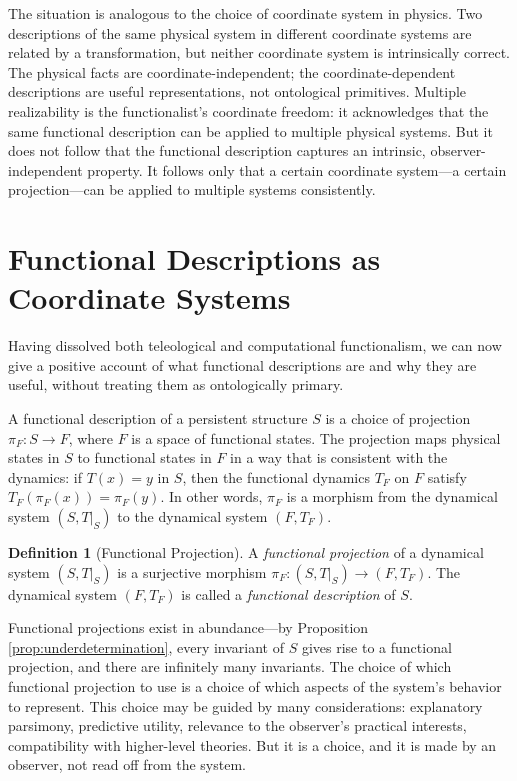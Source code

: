 \documentclass[12pt, a4paper, oneside]{article}
\theoremstyle{plain}
\theoremstyle{definition}
\newtheorem{definition}[theorem]{Definition}
\theoremstyle{remark}
\newcommand{\T}{T}
\newcommand{\proj}{\pi}
\begin{document}
The situation is analogous to the choice of coordinate system in physics. Two descriptions of the same physical system in different coordinate systems are related by a transformation, but neither coordinate system is intrinsically correct. The physical facts are coordinate-independent; the coordinate-dependent descriptions are useful representations, not ontological primitives. Multiple realizability is the functionalist's coordinate freedom: it acknowledges that the same functional description can be applied to multiple physical systems. But it does not follow that the functional description captures an intrinsic, observer-independent property. It follows only that a certain coordinate system---a certain projection---can be applied to multiple systems consistently.

\section{Functional Descriptions as Coordinate Systems}

Having dissolved both teleological and computational functionalism, we can now give a positive account of what functional descriptions are and why they are useful, without treating them as ontologically primary.

A functional description of a persistent structure $S$ is a choice of projection $\proj_F : S \to F$, where $F$ is a space of functional states. The projection maps physical states in $S$ to functional states in $F$ in a way that is consistent with the dynamics: if $\T(x) = y$ in $S$, then the functional dynamics $\T_F$ on $F$ satisfy $\T_F(\proj_F(x)) = \proj_F(y)$. In other words, $\proj_F$ is a morphism from the dynamical system $(S, \T|_S)$ to the dynamical system $(F, \T_F)$.

\begin{definition}[Functional Projection]
A \emph{functional projection} of a dynamical system $(S, \T|_S)$ is a surjective morphism $\proj_F : (S, \T|_S) \to (F, \T_F)$. The dynamical system $(F, \T_F)$ is called a \emph{functional description} of $S$.
\end{definition}

Functional projections exist in abundance---by Proposition \ref{prop:underdetermination}, every invariant of $S$ gives rise to a functional projection, and there are infinitely many invariants. The choice of which functional projection to use is a choice of which aspects of the system's behavior to represent. This choice may be guided by many considerations: explanatory parsimony, predictive utility, relevance to the observer's practical interests, compatibility with higher-level theories. But it is a choice, and it is made by an observer, not read off from the system.
\end{document}
